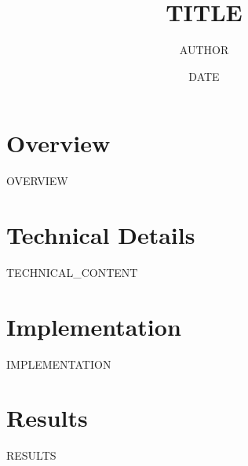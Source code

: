 \documentclass[11pt,a4paper]{article}
\title{{{TITLE}}}
\author{{{AUTHOR}}}
\date{{{DATE}}}
\begin{document}
\maketitle

\section{Overview}
{{OVERVIEW}}

\section{Technical Details}
{{TECHNICAL_CONTENT}}

\section{Implementation}
{{IMPLEMENTATION}}

\section{Results}
{{RESULTS}}
\end{document}
